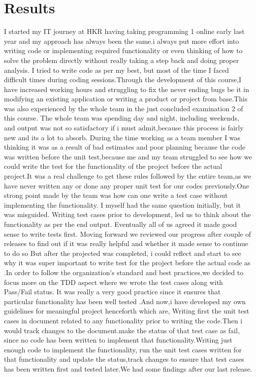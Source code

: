 \documentclass{article}
\begin{document}
{\newpage
\section{Results}

I started my IT journey at HKR having taking programming 1 online early last year and my approach has always been the same.i always put more effort into writing code or implementing required functionality or even thinking of how to solve the problem directly without really taking a step back and doing proper analysis. I tried to write code as per my best, but most of the time I faced difficult times during coding sessions.Through the development of this course,I have increased working hours and struggling to fix the never ending bugs be it in modifying an existing application or writing a product or project from base.This was also experienced by the whole team in the just concluded examination 2 of this course. The whole team was spending day and night, including weekends, and output was not so satisfactory if i must admit,because this process is fairly new and its a lot to absorb.  During the time working as a team member I was thinking it was as a result of bad estimates and poor planning because the code was written before the unit test,because me and my team struggled to see how we could write the test for the functionality of the project before the actual project.It was a real challenge to get these rules followed by the entire team,as we have never written any or done any proper unit test for our codes previously.One strong point made by the team was how can one write a test case without implementing the functionality. I myself had the same question initially, but it was misguided. Writing test cases prior to development, led us to think about the functionality as per the end  output. Eventually all of us agreed it made good sense to write tests first. Moving forward we reviewed our progress after couple of releases to find out if it was really helpful and whether it made sense to continue to do so But after the projected was completed, i could reflect and start to see why it was super important to write test for the project before the actual code  as .In order to follow the organization’s standard and best practices,we decided to focus more on the TDD aspect where we  wrote the test cases along with Pass/Fail status. It was really a very good practice since it ensures that particular functionality has been well tested .And  now,i have developed my own guidelines for meaningful project henceforth which are,
Writing first the unit test cases in document related to any functionality prior to writing the code.Then i would track changes to the document.make the status of that test case as fail, since no code has been written to implement that functionality.Writing just enough code to implement the functionality, run the unit test cases written for that functionality and update the status,track changes to ensure that test cases has been written first and tested later.We had some findings after our last release.
}
\end{document}
